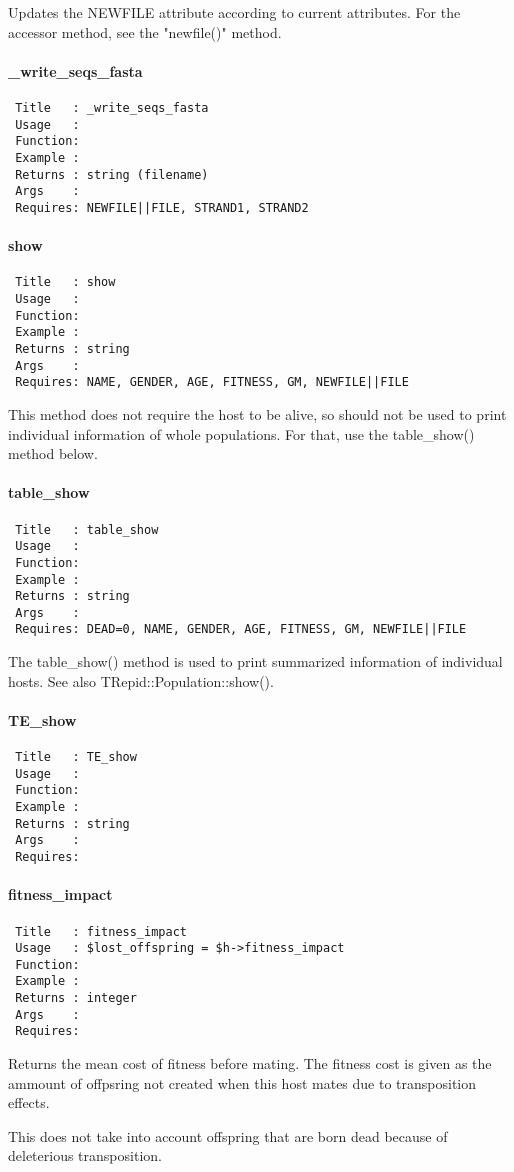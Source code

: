 Updates the NEWFILE attribute according to current attributes. For the
accessor method, see the "newfile()" method.

\paragraph*{\_write\_seqs\_fasta\label{_write_seqs_fasta}}
\begin{verbatim}
 Title   : _write_seqs_fasta
 Usage   : 
 Function: 
 Example : 
 Returns : string (filename)
 Args    : 
 Requires: NEWFILE||FILE, STRAND1, STRAND2
\end{verbatim}
\paragraph*{show\label{show}}
\begin{verbatim}
 Title   : show
 Usage   : 
 Function: 
 Example : 
 Returns : string
 Args    : 
 Requires: NAME, GENDER, AGE, FITNESS, GM, NEWFILE||FILE
\end{verbatim}


This method does not require the host to be alive, so should not be
used to print individual information of whole populations. For that,
use the table\_show() method below.

\paragraph*{table\_show\label{table_show}}
\begin{verbatim}
 Title   : table_show
 Usage   : 
 Function: 
 Example : 
 Returns : string
 Args    : 
 Requires: DEAD=0, NAME, GENDER, AGE, FITNESS, GM, NEWFILE||FILE
\end{verbatim}


The table\_show() method is used to print summarized information of
individual hosts. See also TRepid::Population::show().

\paragraph*{TE\_show\label{TE_show}}
\begin{verbatim}
 Title   : TE_show
 Usage   :
 Function: 
 Example :
 Returns : string
 Args    :
 Requires:
\end{verbatim}
\paragraph*{fitness\_impact\label{fitness_impact}}
\begin{verbatim}
 Title   : fitness_impact
 Usage   : $lost_offspring = $h->fitness_impact
 Function: 
 Example : 
 Returns : integer
 Args    :
 Requires:
\end{verbatim}


Returns the mean cost of fitness before mating. The fitness cost is given as the ammount of offpsring not created when this host mates due to transposition effects.



This does not take into account offspring that are born dead because of deleterious transposition.

